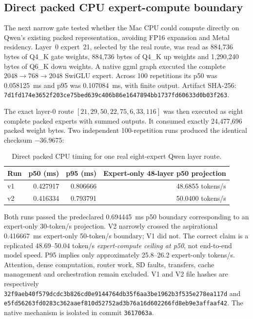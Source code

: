 \subsection{Direct packed CPU expert-compute boundary}

The next narrow gate tested whether the Mac CPU could compute directly on Qwen's
existing packed representation, avoiding FP16 expansion and Metal residency.
Layer~0 expert~21, selected by the real route, was read as 884{,}736 bytes of
Q4\_K gate weights, 884{,}736 bytes of Q4\_K up weights and 1{,}290{,}240 bytes
of Q6\_K down weights.  A native ggml graph executed the complete
$2048\rightarrow768\rightarrow2048$ SwiGLU expert.  Across 100 repetitions its
p50 was 0.058125~ms and p95 was 0.107084~ms, with finite output.  Artifact
SHA-256:
\texttt{7d1fd174e3652f203ce75bed639c406b86e1647894bb1737fd60633d0b03f263}.

The exact layer-0 route $[21,29,50,22,75,6,33,116]$ was then executed as eight
complete packed experts with summed outputs.  It consumed exactly 24{,}477{,}696
packed weight bytes.  Two independent 100-repetition runs produced the identical
checksum $-36.9675$:
\begin{table}[ht]
\centering
\begin{tabular}{lrrr}
\toprule
Run & p50 (ms) & p95 (ms) & Expert-only 48-layer p50 projection \\
\midrule
v1 & 0.427917 & 0.806666 & 48.6855 tokens/s \\
v2 & 0.416334 & 0.793791 & 50.0400 tokens/s \\
\bottomrule
\end{tabular}
\caption{Direct packed CPU timing for one real eight-expert Qwen layer route.}
\end{table}
Both runs passed the predeclared 0.694445~ms p50 boundary corresponding to an
expert-only 30-token/s projection.  V2 narrowly crossed the aspirational
0.416667~ms expert-only 50-token/s boundary; V1 did not.  The correct claim is a
replicated 48.69--50.04 token/s \emph{expert-compute ceiling at p50}, not
end-to-end model speed.  P95 implies only approximately 25.8--26.2 expert-only
tokens/s.  Attention, dense computation, router work, SD faults, transfers,
cache management and orchestration remain excluded.  V1 and V2 file hashes are
respectively
\texttt{32f9aeb40f579dcdc3b826cd0e9144764db35f6aa3be1962b3f535e278ea117d}
and
\texttt{e5fd56263fd0283c362aaef810d52752ad3b76a16d602266fd8eb9e3affaaf42}.
The native mechanism is isolated in commit \texttt{3617063a}.

